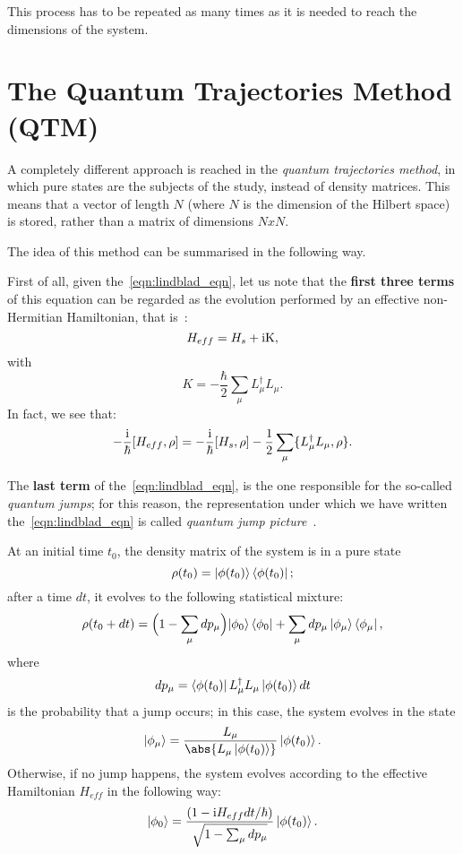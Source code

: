 This process has to be repeated as many times as it is needed to reach the dimensions of the system.


\section{The Quantum Trajectories Method (QTM)}
A completely different approach is reached in the \emph{quantum trajectories method}, in which pure states are the subjects of the study, instead of density matrices. This means that a vector of length $N$ (where $N$ is the dimension of the Hilbert space) is stored, rather than a matrix of dimensions $NxN$.

The idea of this method can be summarised in the following way.

First of all, given the~\ref{eqn:lindblad_eqn}, let us note that the \textbf{first three terms} of this equation can be regarded as the evolution performed by an effective non-Hermitian Hamiltonian, that is~\cite{PhysRevA.69.062317}:
\[
H_{eff} = H_s + \rm{i}K,
\]
with
\[
K = -\frac{\hbar}{2}\sum_\mu L_{\mu}^{\dagger}L_{\mu}.
\]
In fact, we see that:
\[
    -\frac{\rm{i}}{\hbar}[H_{eff}, \rho] = -\frac{\rm{i}}{\hbar}[H_s, \rho] - \frac{1}{2}\sum_\mu \{L_{\mu}^{\dagger}L_{\mu}, \rho\}.
\]

The \textbf{last term} of the~\ref{eqn:lindblad_eqn}, is the one responsible for the so-called \emph{quantum jumps}; for this reason, the representation under which we have written the~\ref{eqn:lindblad_eqn} is called \emph{quantum jump picture}~\cite{PhysRevA.69.062317}. 

At an initial time $t_0$, the density matrix of the system is in a pure state
\[
\rho(t_0) = \ket{\phi(t_0)}\bra{\phi(t_0)};
\]
after a time $dt$, it evolves to the following statistical mixture:
\begin{equation}
    \rho(t_0 + dt) = \Bigl(1-\sum_\mu dp_\mu \Bigl)\ket{\phi_0}\bra{\phi_0} + \sum_\mu dp_\mu \ket{\phi_\mu}\bra{\phi_\mu},
\end{equation}
where
\begin{equation}
    dp_\mu = \bra{\phi(t_0)}L_{\mu}^{\dagger}L_{\mu}\ket{\phi(t_0)}dt
\end{equation}
is the probability that a jump occurs; in this case, the system evolves in the state
\begin{equation}
\label{eqn:phi_mu}
    \ket{\phi_\mu} = \frac{L_\mu}{\abs{L_\mu\ket{\phi(t_0)}}}\ket{\phi(t_0)}.
\end{equation}
Otherwise, if no jump happens, the system evolves according to the effective Hamiltonian $H_{eff}$ in the following way:
\begin{equation}
    \ket{\phi_0} = \frac{(1-\textrm{i}H_{eff}dt/\hbar)}{\sqrt{1-\sum_\mu dp_\mu}}\ket{\phi(t_0)}.
\end{equation}

